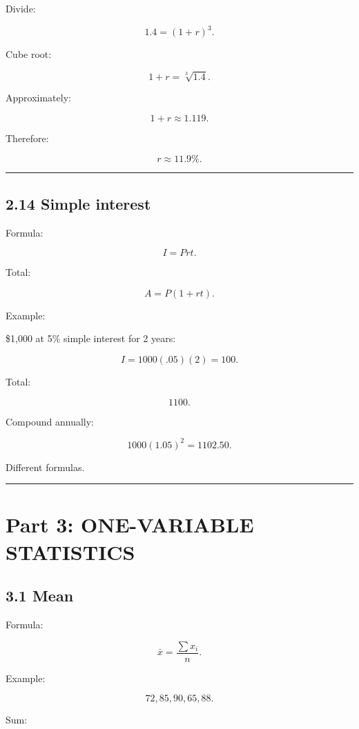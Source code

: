 \documentclass[
]{article}
\begin{document}
Divide:

\[
1.4=(1+r)^3.
\]

Cube root:

\[
1+r=\sqrt[3]{1.4}.
\]

Approximately:

\[
1+r\approx1.119.
\]

Therefore:

\[
\boxed{r\approx11.9\%}.
\]

\begin{center}\rule{0.5\linewidth}{0.5pt}\end{center}

\subsection{2.14 Simple interest}\label{simple-interest}

Formula:

\[
\boxed{I=Prt}.
\]

Total:

\[
\boxed{A=P(1+rt)}.
\]

Example:

\$1,000 at 5\% simple interest for 2 years:

\[
I=1000(.05)(2)=100.
\]

Total:

\[
\boxed{1100}.
\]

Compound annually:

\[
1000(1.05)^2
=
1102.50.
\]

Different formulas.

\begin{center}\rule{0.5\linewidth}{0.5pt}\end{center}

\section{Part 3: ONE-VARIABLE
STATISTICS}\label{part-3-one-variable-statistics}

\subsection{3.1 Mean}\label{mean}

Formula:

\[
\boxed{\bar x=\frac{\sum x_i}{n}}.
\]

Example:

\[
72,85,90,65,88.
\]

Sum:
\end{document}
